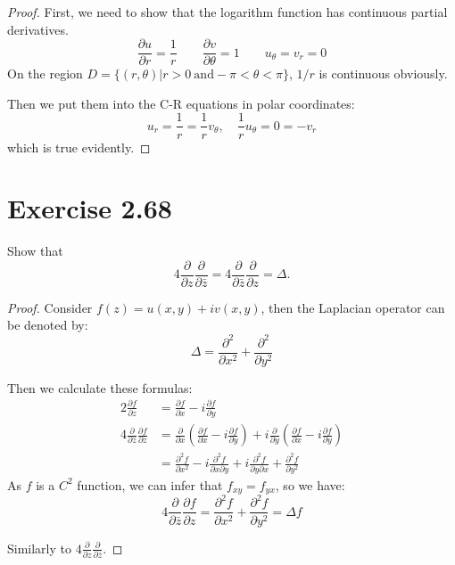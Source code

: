 \documentclass{article}
\begin{document}
\begin{proof}
  First, we need to show that the logarithm function has continuous
  partial derivatives.
  \[
    \frac{\partial u}{\partial r} = \frac{1}{r} \qquad
    \frac{\partial v}{\partial \theta} = 1 \qquad
    u_\theta = v_r = 0
  \]
  On the region $D = \{(r, \theta) | r > 0 \ \text{and} -\pi < \theta <
  \pi\}$, $1/r$ is continuous obviously.

  Then we put them into the C-R equations in polar coordinates:
  \[
    u_r = \frac{1}{r} = \frac{1}{r} v_\theta,\quad \frac{1}{r}
    u_\theta = 0 = -v_r
  \]
  which is true evidently.

\end{proof}

\section{Exercise 2.68}

Show that
\[
  4 \frac{\partial}{\partial z} \frac{\partial}{\partial \bar{z}} = 4
  \frac{\partial}{\partial \bar{z}} \frac{\partial}{\partial z} = \Delta.
\]

\begin{proof}
  Consider $f(z) = u(x,y) + iv(x,y)$, then the Laplacian operator can be denoted
  by:
  \[
    \Delta = \frac{\partial^2}{\partial x^2} + \frac{\partial^2}{\partial y^2}
  \]

  Then we calculate these formulas:
  \[
    \begin{aligned}
      2\frac{\partial f}{\partial z} &= \frac{\partial f}{\partial x}
      - i \frac{\partial f}{\partial y} \\
      4\frac{\partial }{\partial \bar{z}}\frac{\partial f}{\partial
      z} &= \frac{\partial}{\partial x}(\frac{\partial f}{\partial x}
      - i \frac{\partial f}{\partial y} ) + i
      \frac{\partial}{\partial y}(\frac{\partial f}{\partial x}
      - i \frac{\partial f}{\partial y} ) \\
      &= \frac{\partial^2 f}{\partial x^2} - i \frac{\partial^2
      f}{\partial x \partial y} + i\frac{\partial^2 f}{\partial
      y \partial x} + \frac{\partial^2 f}{\partial y^2}
    \end{aligned}
  \]
  As $f$ is a $C^2$ function, we can infer that $f_{xy} = f_{yx}$, so we have:
  \[
    4\frac{\partial }{\partial \bar{z}}\frac{\partial f}{\partial z}
    = \frac{\partial^2 f}{\partial x^2}+ \frac{\partial^2 f}{\partial
    y^2} = \Delta f
  \]

  Similarly to $4\frac{\partial}{\partial z} \frac{\partial}{\partial \bar{z}}$.
\end{proof}
\end{document}

